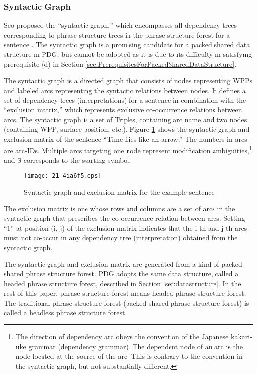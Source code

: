 \documentclass[english]{jnlp_1.4_rep}
\theoremstyle{break}
\theoremstyle{plain}
\theoremstyle{plain}
\begin{document}
\subsubsection{Syntactic Graph}

Seo proposed the ``syntactic graph,'' which encompasses all dependency
trees corresponding to phrase structure trees in the phrase structure
forest for a sentence \cite{Seo89,Rim90}. The syntactic graph is a
promising candidate for a packed shared data structure in PDG, but
cannot be adopted as it is due to its difficulty in satisfying
prerequisite (d) in Section
\ref{sec:PrerequisitesForPackedSharedDataStructure}.

The syntactic graph is a directed graph that consists of nodes
representing WPPs and labeled arcs representing the syntactic
relations between nodes. It defines a set of dependency trees
(interpretations) for a sentence in combination with the ``exclusion
matrix,'' which represents exclusive co-occurrence relations between
arcs. The syntactic graph is a set of Triples, containing arc name and
two nodes (containing WPP, surface position,
etc.). Figure \ref{fig:KoubunGraph} shows the syntactic graph and
exclusion matrix of the sentence ``Time flies like an arrow.'' The
numbers in arcs are arc-IDs. Multiple arcs targeting one node
represent modification ambiguities,\footnote{The direction of
  dependency arc obeys the convention of the Japanese kakari-uke
  grammar (dependency grammar). The dependent node of an arc is the
  node located at the source of the arc. This is contrary to the
  convention in the syntactic graph, but not substantially
  different.} and S corresponds to the starting symbol.

\begin{figure}[b]
 \begin{center}
\texttt{[image: 21-4ia6f5.eps]}
 \end{center}
\caption{Syntactic graph and exclusion matrix for the example sentence}
\label{fig:KoubunGraph}
\end{figure}

The exclusion matrix is one whose rows and columns are a set of
arcs in the syntactic graph that prescribes the co-occurrence relation
between arcs. Setting ``1'' at position (i, j) of the exclusion
matrix indicates that the i-th and j-th arcs must not co-occur in any
dependency tree (interpretation) obtained from the syntactic graph.

The syntactic graph and exclusion matrix are generated from a kind
of packed shared phrase structure forest. PDG adopts the same data
structure, called a headed phrase structure forest, described in Section
\ref{sec:datastructure}. In the rest of this paper, phrase structure
forest means headed phrase structure forest. The traditional phrase
structure forest (packed shared phrase structure forest) is called a
headless phrase structure forest.
\end{document}
